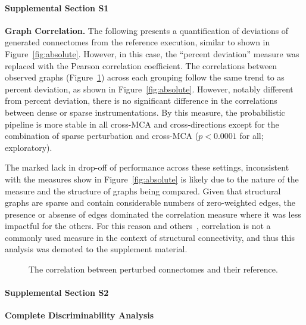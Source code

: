 \documentclass[10pt,letterpaper]{article}
\begin{document}
\paragraph*{Supplemental Section S1}
\label{supsec:correlation}
{\bf Graph Correlation.} The following presents a quantification of deviations of
generated connectomes from the reference execution, similar to shown in
Figure~\ref{fig:absolute}. However, in this case, the ``percent deviation'' measure
was replaced with the Pearson correlation coefficient. The correlations between
observed graphs (Figure~\ref{fig:correlation}) across each grouping follow the same
trend to as percent deviation, as shown in Figure~\ref{fig:absolute}. However, notably
different from percent deviation, there is no significant difference in the
correlations between dense or sparse instrumentations. By this measure, the
probabilistic pipeline is more stable in all cross-MCA and cross-directions except
for the combination of sparse perturbation and cross-MCA ($p < 0.0001$ for all;
exploratory).

The marked lack in drop-off of performance across these settings, inconsistent with
the measures show in Figure~\ref{fig:absolute} is likely due to the nature of the
measure and the structure of graphs being compared. Given that structural graphs are
sparse and contain considerable numbers of zero-weighted edges, the presence or
absense of edges dominated the correlation measure where it was less impactful for
the others. For this reason and others~\cite{huang2016linking}, correlation is not a
commonly used measure in the context of structural connectivity, and thus this
analysis was demoted to the supplement material.

\begin{figure}[ht]\centering
\caption{The correlation between perturbed connectomes and their reference.}
\label{fig:correlation}
\end{figure}

\paragraph*{Supplemental Section S2}
\label{supsec:discrimfull}
{\bf Complete Discriminability Analysis}
\end{document}
